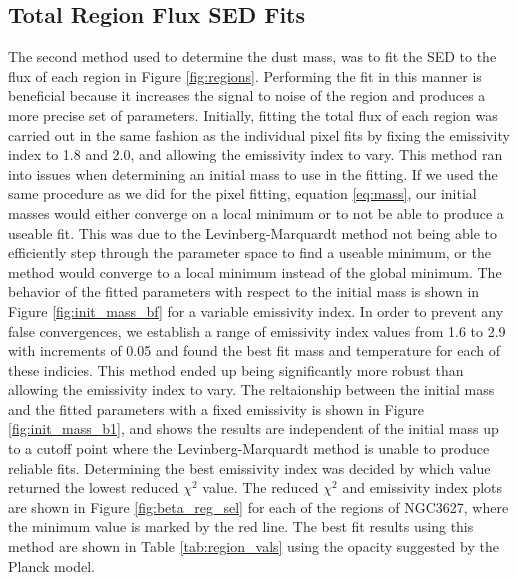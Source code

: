 \subsection{Total Region Flux SED Fits}

The second method used to determine the dust mass, was to fit the SED to the flux of each region in Figure \ref{fig:regions}.  Performing the fit in this manner is beneficial because it increases the signal to noise of the region and produces a more precise set of parameters.  Initially, fitting the total flux of each region was carried out in the same fashion as the individual pixel fits by fixing the emissivity index to 1.8 and 2.0, and allowing the emissivity index to vary.  This method ran into issues when determining an initial mass to use in the fitting.  If we used the same procedure as we did for the pixel fitting, equation \ref{eq:mass}, our initial masses would either converge on a local minimum or to not be able to produce a useable fit.  This was due to the Levinberg-Marquardt method not being able to efficiently step through the parameter space to find a useable minimum, or the method would converge to a local minimum instead of the global minimum.  The behavior of the fitted parameters with respect to the initial mass is shown in Figure \ref{fig:init_mass_bf} for a variable emissivity index.  In order to prevent any false convergences, we establish a range of emissivity index values from 1.6 to 2.9 with increments of 0.05 and found the best fit mass and temperature for each of these indicies.  This method ended up being significantly more robust than allowing the emissivity index to vary.  The reltaionship between the initial mass and the fitted parameters with a fixed emissivity is shown in Figure \ref{fig:init_mass_b1}, and shows the results are independent of the initial mass up to a cutoff point where the Levinberg-Marquardt method is unable to produce reliable fits.  Determining the best emissivity index was decided by which value returned the lowest reduced $\chi^2$ value.  The reduced $\chi^2$ and emissivity index plots are shown in Figure \ref{fig:beta_reg_sel} for each of the regions of NGC3627, where the minimum value is marked by the red line.  The best fit results using this method are shown in Table \ref{tab:region_vals} using the opacity suggested by the Planck model.

